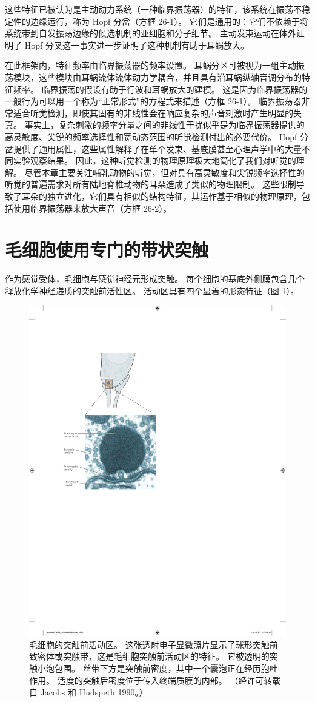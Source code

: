 这些特征已被认为是主动动力系统（一种临界振荡器）的特征，该系统在振荡不稳定性的边缘运行，称为 Hopf 分岔（方框 26-1）。 它们是通用的：它们不依赖于将系统带到自发振荡边缘的候选机制的亚细胞和分子细节。 主动发束运动在体外证明了 Hopf 分叉这一事实进一步证明了这种机制有助于耳蜗放大。

在此框架内，特征频率由临界振荡器的频率设置。 耳蜗分区可被视为一组主动振荡模块，这些模块由耳蜗流体流体动力学耦合，并且具有沿耳蜗纵轴音调分布的特征频率。 临界振荡的假设有助于行波和耳蜗放大的建模。 这是因为临界振荡器的一般行为可以用一个称为“正常形式”的方程式来描述（方框 26-1）。 临界振荡器非常适合听觉检测，即使其固有的非线性会在响应复杂的声音刺激时产生明显的失真。 事实上，复杂刺激的频率分量之间的非线性干扰似乎是为临界振荡器提供的高灵敏度、尖锐的频率选择性和宽动态范围的听觉检测付出的必要代价。 Hopf 分岔提供了通用属性，这些属性解释了在单个发束、基底膜甚至心理声学中的大量不同实验观察结果。 因此，这种听觉检测的物理原理极大地简化了我们对听觉的理解。 尽管本章主要关注哺乳动物的听觉，但对具有高灵敏度和尖锐频率选择性的听觉的普遍需求对所有陆地脊椎动物的耳朵造成了类似的物理限制。 这些限制导致了耳朵的独立进化，它们具有相似的结构特征，其运作基于相似的物理原理，包括使用临界振荡器来放大声音（方框 26-2）。


\section{毛细胞使用专门的带状突触}

作为感觉受体，毛细胞与感觉神经元形成突触。 每个细胞的基底外侧膜包含几个释放化学神经递质的突触前活性区。 活动区具有四个显着的形态特征（图 \ref{fig:26_16}）。

\begin{figure}[htbp]
	\centering
	\includegraphics[width=0.5\linewidth]{chap26/fig_26_16}
	\caption{毛细胞的突触前活动区。 这张透射电子显微照片显示了球形突触前致密体或突触带，这是毛细胞突触前活动区的特征。 它被透明的突触小泡包围。 丝带下方是突触前密度，其中一个囊泡正在经历胞吐作用。 适度的突触后密度位于传入终端质膜的内部。 （经许可转载自 Jacobs 和 Hudspeth 1990。）}
	\label{fig:26_16}
\end{figure}

